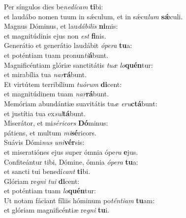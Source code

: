 \evenverse Per síngulos dies be\textit{ne}\textit{dí}\textit{cam} \textbf{ti}bi:~\*\\
\evenverse et laudábo nomen tuum in sǽculum, et in sǽcu\textit{lum} \textbf{sǽ}culi.\\
\oddverse Magnus Dóminus, et lau\textit{dá}\textit{bi}\textit{lis} \textbf{ni}mis:~\*\\
\oddverse et magnitúdinis ejus non \textit{est} \textbf{fi}nis.\\
\evenverse Generátio et generátio laudábit \textit{ó}\textit{pe}\textit{ra} \textbf{tu}a:~\*\\
\evenverse et poténtiam tuam pronun\textit{ti}\textbf{á}bunt.\\
\oddverse Magnificéntiam glóriæ sanctitátis \textit{tu}\textit{æ} \textit{lo}\textbf{quén}tur:~\*\\
\oddverse et mirabília tua \textit{nar}\textbf{rá}bunt.\\
\evenverse Et virtútem terribílium \textit{tu}\textit{ó}\textit{rum} \textbf{di}cent:~\*\\
\evenverse et magnitúdinem tuam \textit{nar}\textbf{rá}bunt.\\
\oddverse Memóriam abundántiæ suavitátis tu\textit{æ} \textit{e}\textit{ru}\textbf{ctá}bunt:~\*\\
\oddverse et justítia tua ex\textit{sul}\textbf{tá}bunt.\\
\evenverse Miserátor, et mi\textit{sé}\textit{ri}\textit{cors} \textbf{Dó}minus:~\*\\
\evenverse pátiens, et multum \textit{mi}\textbf{sé}ricors.\\
\oddverse Suávis Dómi\textit{nus} \textit{u}\textit{ni}\textbf{vér}sis:~\*\\
\oddverse et miseratiónes ejus super ómnia ópe\textit{ra} \textbf{e}jus.\\
\evenverse Confiteántur tibi, Dómine, ómnia \textit{ó}\textit{pe}\textit{ra} \textbf{tu}a:~\*\\
\evenverse et sancti tui benedí\textit{cant} \textbf{ti}bi.\\
\oddverse Glóriam re\textit{gni} \textit{tu}\textit{i} \textbf{di}cent:~\*\\
\oddverse et poténtiam tuam \textit{lo}\textbf{quén}tur:\\
\evenverse Ut notam fáciant fíliis hóminum po\textit{tén}\textit{ti}\textit{am} \textbf{tu}am:~\*\\
\evenverse et glóriam magnificéntiæ re\textit{gni} \textbf{tu}i.\\
